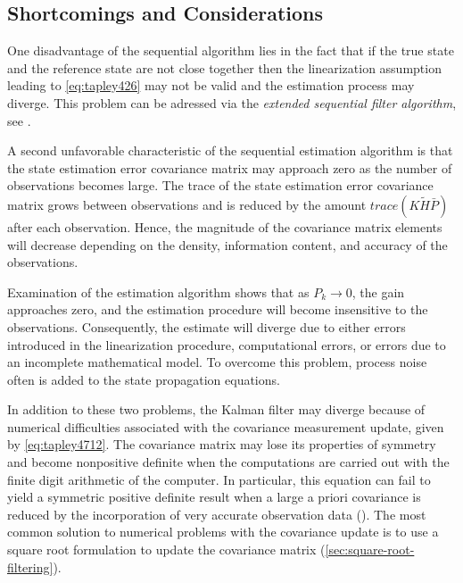 \subsection{Shortcomings and Considerations}
One disadvantage of the sequential algorithm lies in the fact that if the true state
and the reference state are not close together then the linearization assumption
leading to \ref{eq:tapley426} may not be valid and the estimation process may diverge.
This problem can be adressed via the \emph{extended sequential filter algorithm}, see
\cite{tapley}.

A second unfavorable characteristic of the sequential estimation algorithm is
that the state estimation error covariance matrix may approach zero as the number
of observations becomes large. The trace of the state estimation error covariance
matrix grows between observations and is reduced by the amount \(trace(K\tilde{H}\bar{P})\)
after each observation. Hence, the magnitude of the covariance matrix elements
will decrease depending on the density, information content, and accuracy of the
observations.

Examination of the estimation algorithm shows that as \(P_k \to 0\), the gain
approaches zero, and the estimation procedure will become insensitive to the
observations. Consequently, the estimate will diverge due to either errors introduced
in the linearization procedure, computational errors, or errors due to an incomplete
mathematical model. To overcome this problem, process noise often is added to
the state propagation equations.

In addition to these two problems, the Kalman filter may diverge because of
numerical difficulties associated with the covariance measurement update, given by
\ref{eq:tapley4712}. The covariance matrix may lose its properties of symmetry and
become nonpositive definite when the computations are carried out with the finite
digit arithmetic of the computer. In particular, this equation can fail to yield a
symmetric positive definite result when a large a priori covariance is reduced by
the incorporation of very accurate observation data (\cite{tapley}). The most common
solution to numerical problems with the covariance update is to use a square root
formulation to update the covariance matrix (\ref{sec:square-root-filtering}).

